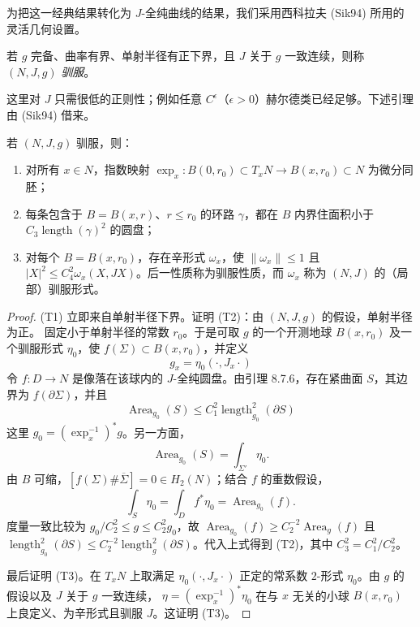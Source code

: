 为把这一经典结果转化为 $J$-全纯曲线的结果，我们采用西科拉夫 (Sik94) 所用的灵活几何设置。
\begin{definition}\label{def:ch8-tame-almost-complex-triple}
若 $g$ 完备、曲率有界、单射半径有正下界，且 $J$ 关于 $g$ 一致连续，则称 $(N,J,g)$ \emph{驯服}。
\end{definition}
这里对 $J$ 只需很低的正则性；例如任意 $C^\epsilon$（$\epsilon>0$）赫尔德类已经足够。下述引理由 (Sik94) 借来。
\begin{lemma}\label{lem:ch8-tame-local-geometry}
若 $(N,J,g)$ 驯服，则：
\begin{enumerate}[label=(T\arabic*)]
\item 对所有 $x\in N$，指数映射
$\exp_x:B(0,r_0)\subset T_xN\to B(x,r_0)\subset N$ 为微分同胚；
\item 每条包含于 $B=B(x,r)$、$r\leq r_0$ 的环路 $\gamma$，都在
$B$ 内界住面积小于 $C_3\operatorname{length}(\gamma)^2$ 的圆盘；
\item 对每个 $B=B(x,r_0)$，存在辛形式 $\omega_x$，使
$\|\omega_x\|\leq1$ 且
$|X|^2\leq C_4^2\omega_x(X,JX)$。后一性质称为驯服性质，而
$\omega_x$ 称为 $(N,J)$ 的（局部）驯服形式。
\end{enumerate}
\end{lemma}
\begin{proof}
(T1) 立即来自单射半径下界。证明 (T2)：由 $(N,J,g)$ 的假设，单射半径为正。
固定小于单射半径的常数 $r_0$。于是可取 $g$ 的一个开测地球
$B(x,r_0)$ 及一个驯服形式 $\eta_0$，使 $f(\Sigma)\subset B(x,r_0)$，并定义
\begin{equation}g_x=\eta_0(\cdot,J_x\cdot)\label{eq:ch8-local-taming-metric}\end{equation}
令 $f:D\to N$ 是像落在该球内的 $J$-全纯圆盘。由引理 8.7.6，存在紧曲面
$S$，其边界为 $f(\partial\Sigma)$，并且
\begin{equation}\operatorname{Area}_{g_0}(S)\leq C_1^2\operatorname{length}_{g_0}^2(\partial S)\label{eq:ch8-local-filling-area}\end{equation}
这里 $g_0=(\exp_x^{-1})^*g$。另一方面，
\[
\operatorname{Area}_{g_0}(S)=\int_{\Sigma'}\eta_0.
\]
由 $B$ 可缩，$[f(\Sigma)\#\overline\Sigma]=0\in H_2(N)$；结合 $f$ 的重数假设，
\[
 \int_S\eta_0=\int_Df^*\eta_0=\operatorname{Area}_{g_0}(f).
\]
度量一致比较为 $g_0/C_2^2\leq g\leq C_2^2g_0$，故
$\operatorname{Area}_{g_0}(f)\geq C_2^{-2}\operatorname{Area}_g(f)$ 且
$\operatorname{length}_{g_0}^2(\partial S)\leq C_2^{-2}
\operatorname{length}_g^2(\partial S)$。代入上式得到 (T2)，其中
$C_3^2=C_1^2/C_2^2$。

最后证明 (T3)。在 $T_xN$ 上取满足 $\eta_0(\cdot,J_x\cdot)$ 正定的常系数
$2$-形式 $\eta_0$。由 $g$ 的假设以及 $J$ 关于 $g$ 一致连续，
$\eta=(\exp_x^{-1})^*\eta_0$ 在与 $x$ 无关的小球 $B(x,r_0)$ 上良定义、为辛形式且驯服 $J$。这证明 (T3)。
\end{proof}
